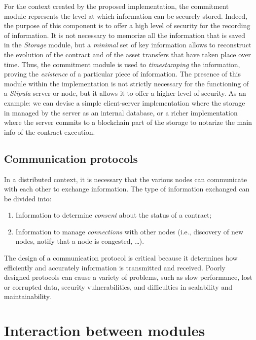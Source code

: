 For the context created by the proposed implementation, the commitment module represents the level at which 
information can be securely stored. Indeed, the purpose of this component is to offer a high level of security 
for the recording of information. It is not necessary to memorize all the information that is saved in the 
\textit{Storage} module, but a \textit{minimal} set of key information allows to reconstruct the evolution of 
the contract and of the asset transfers that have taken place over time. Thus, the commitment module is used to 
\textit{timestamping} the information, proving the \textit{existence} of a particular piece of information. The 
presence of this module within the implementation is not strictly necessary for the functioning of a 
\textit{Stipula} server or node, but it allows it to offer a higher level of security. As an example: we can 
devise a simple client-server implementation where the storage in managed by the server as an internal database, 
or a richer implementation where the server commits to a blockchain part of the storage to notarize the main 
info of the contract execution.

\subsection{Communication protocols}
\label{communication-protocols-module}

In a distributed context, it is necessary that the various nodes can communicate with each other to exchange 
information. The type of information exchanged can be divided into:
\begin{enumerate}
	\item Information to determine \textit{consent} about the status of a contract;
	\item Information to manage \textit{connections} with other nodes (i.e., discovery of new nodes, notify 
	that a node is congested, \dots).
\end{enumerate}

The design of a communication protocol is critical because it determines how efficiently and accurately 
information is transmitted and received. Poorly designed protocols can cause a variety of problems, such as 
slow performance, lost or corrupted data, security vulnerabilities, and difficulties in scalability and 
maintainability.

\section{Interaction between modules}

